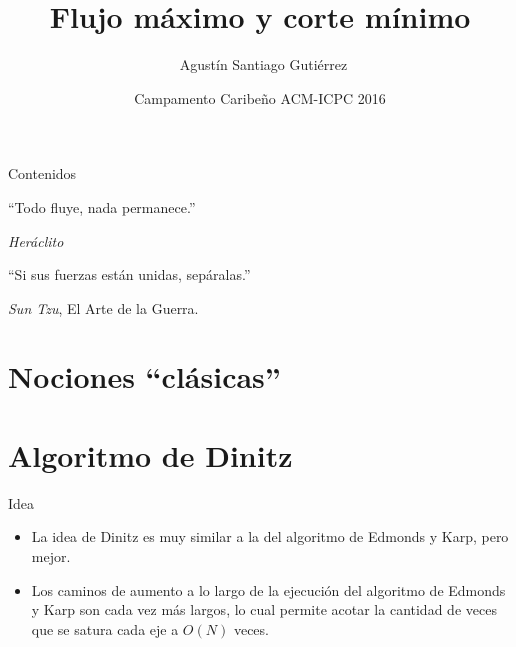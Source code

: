 \documentclass{beamer}
\title[Maxflow-Mincut] %
{Flujo máximo y corte mínimo}
\author[Agustín Gutiérrez] %
{~Agustín Santiago Gutiérrez}
\institute[UBA] %
{
  Facultad de Ciencias Exactas y Naturales\\
  Universidad de Buenos Aires
}
\date[Camp 2016] %
{Campamento Caribeño ACM-ICPC 2016}
\begin{document}
\begin{frame}
  \titlepage
\end{frame}

\begin{frame}{Contenidos}
  \tableofcontents
\end{frame}


\begin{frame}
  ``Todo fluye, nada permanece.''
  
\hfill \textit{Heráclito}

\vfill

``Si sus fuerzas están unidas, sepáralas.''

\hfill \textit{Sun Tzu}, El Arte de la Guerra.

\end{frame}


\section{Nociones ``clásicas''}

{
    
}

\section{Algoritmo de Dinitz}

\begin{frame}{Idea}
    \begin{itemize}
        \item La idea de Dinitz es muy similar a la del algoritmo de Edmonds y Karp, pero mejor.
        \item Los caminos de aumento a lo largo de la ejecución del algoritmo de Edmonds y Karp son cada vez más largos, lo cual permite acotar la cantidad de veces que se satura cada eje a $O(N)$ veces.
        \pause
    \end{itemize}
\end{frame}
\end{document}
